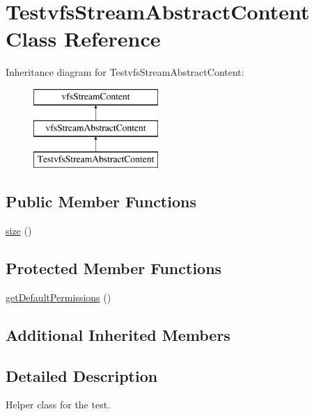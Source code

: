 \hypertarget{classorg_1_1bovigo_1_1vfs_1_1_testvfs_stream_abstract_content}{}\section{Testvfs\+Stream\+Abstract\+Content Class Reference}
\label{classorg_1_1bovigo_1_1vfs_1_1_testvfs_stream_abstract_content}
Inheritance diagram for Testvfs\+Stream\+Abstract\+Content\+:\begin{figure}[H]
\begin{center}
\leavevmode
\includegraphics[height=3.000000cm]{classorg_1_1bovigo_1_1vfs_1_1_testvfs_stream_abstract_content}
\end{center}
\end{figure}
\subsection*{Public Member Functions}
\begin{DoxyCompactItemize}
\item 
\mbox{\hyperlink{classorg_1_1bovigo_1_1vfs_1_1_testvfs_stream_abstract_content_a775bfb88c1bb7975d67f277eade2a1b7}{size}} ()
\end{DoxyCompactItemize}
\subsection*{Protected Member Functions}
\begin{DoxyCompactItemize}
\item 
\mbox{\hyperlink{classorg_1_1bovigo_1_1vfs_1_1_testvfs_stream_abstract_content_a5a7e3863035fc9138bf0c7c486a472cb}{get\+Default\+Permissions}} ()
\end{DoxyCompactItemize}
\subsection*{Additional Inherited Members}


\subsection{Detailed Description}
Helper class for the test. 

